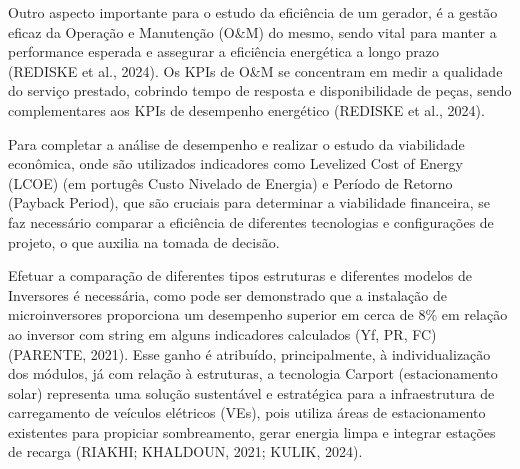 Outro aspecto importante para o estudo da eficiência de um gerador, é a gestão eficaz da Operação e Manutenção (O\&M) do mesmo, sendo vital para manter a performance esperada e assegurar a eficiência energética a longo prazo (REDISKE et al., 2024). Os KPIs de O\&M se concentram em medir a qualidade do serviço prestado, cobrindo tempo de resposta e disponibilidade de peças, sendo complementares aos KPIs de desempenho energético (REDISKE et al., 2024).

Para completar a análise de desempenho e realizar o estudo da viabilidade econômica, onde são utilizados indicadores como Levelized Cost of Energy (LCOE) (em portugês Custo Nivelado de Energia) e Período de Retorno (Payback Period), que são cruciais para determinar a viabilidade financeira, se faz necessário comparar a eficiência de diferentes tecnologias e configurações de projeto, o que auxilia na tomada de decisão.

Efetuar a comparação de diferentes tipos estruturas e diferentes modelos de Inversores é necessária, como pode ser demonstrado que a instalação de microinversores proporciona um desempenho superior em cerca de 8\% em relação ao inversor com string em alguns indicadores calculados (Yf, PR, FC) (PARENTE, 2021). Esse ganho é atribuído, principalmente, à individualização dos módulos, já com relação à estruturas, a tecnologia Carport (estacionamento solar) representa uma solução sustentável e estratégica para a infraestrutura de carregamento de veículos elétricos (VEs), pois utiliza áreas de estacionamento existentes para propiciar sombreamento, gerar energia limpa e integrar estações de recarga (RIAKHI; KHALDOUN, 2021; KULIK, 2024).




